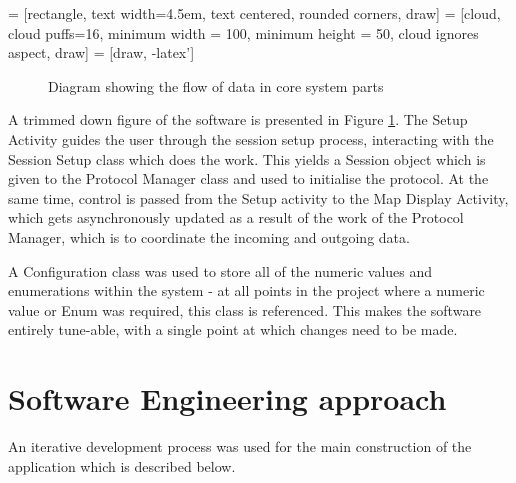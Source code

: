  = [rectangle, text width=4.5em, text centered, rounded corners, draw]
 = [cloud, cloud puffs=16, minimum width = 100, minimum height = 50, cloud ignores aspect, draw]
 = [draw, -latex']
\begin{figure}[ht]
\centering
{}
\caption{Diagram showing the flow of data in core system parts}
\label{fig:dataflow}
\end{figure}

A trimmed down figure of the software is presented in Figure \ref{fig:dataflow}. The Setup Activity guides the user through the session setup process, interacting with the Session Setup class which does the work. This yields a Session object which is given to the Protocol Manager class and used to initialise the protocol. At the same time, control is passed from the Setup activity to the Map Display Activity, which gets asynchronously updated as a result of the work of the Protocol Manager, which is to coordinate the incoming and outgoing data.

A Configuration class was used to store all of the numeric values and enumerations within the system - at all points in the project where a numeric value or Enum was required, this class is referenced. This makes the software entirely tune-able, with a single point at which changes need to be made.

\section{Software Engineering approach}
An iterative development process was used for the main construction of the application which is described below.

